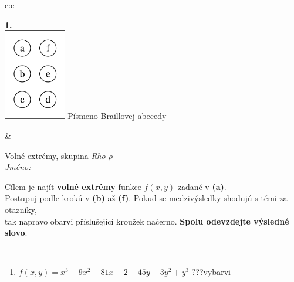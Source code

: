 \documentclass[10pt]{report}
\begin{document}
\begin{tabular}{c:c}
\begin{minipage}[c][104.5mm][t]{0.5\linewidth}
\begin{center}
\begin{minipage}{0.79\linewidth}
\begin{center}
\begin{varwidth}{\linewidth}
\begin{enumerate}
\end{enumerate}
\end{varwidth}
\end{center}
\end{minipage}
\begin{minipage}{0.20\linewidth}
\begin{center}
{\Huge\bfseries 1.} \\[2mm]
\includegraphics[height=40mm]{../images/braille.png}
{\small Písmeno Braillovej abecedy}
\end{center}
\end{minipage}
\end{center}
\end{minipage}
&
\begin{minipage}[c][104.5mm][t]{0.5\linewidth}
\begin{center}
\vspace{7mm}
{\huge Volné extrémy, skupina \textit{Rho $\rho$} -}\\[5mm]
\textit{Jméno:}\phantom{xxxxxxxxxxxxxxxxxxxxxxxxxxxxxxxxxxxxxxxxxxxxxxxxxxxxxxxxxxxxxxxxx}\\[5mm]
\begin{minipage}{0.95\linewidth}
\begin{center}
Cílem je najít \textbf{volné extrémy} funkce $f(x,y)$ zadané v \textbf{(a)}.\\Postupuj podle krokú v \textbf{(b)} až \textbf{(f)}. Pokud se medzivýsledky shodujú s těmi za otazníky,\\tak napravo obarvi příslušející kroužek načerno. \textbf{Spolu odevzdejte výsledné slovo}.
\end{center}
\end{minipage}
\\[1mm]
\begin{minipage}{0.79\linewidth}
\begin{center}
\begin{varwidth}{\linewidth}
\begin{enumerate}
\normalsize
\item $f(x,y)=x^3-9x^2-81x-2-45y-3y^2+y^3$\quad \dotfill\; ???\;\dotfill \quad vybarvi

\end{enumerate}
\end{varwidth}
\end{center}
\end{minipage}
\end{center}
\end{minipage}
\end{tabular}
\end{document}
